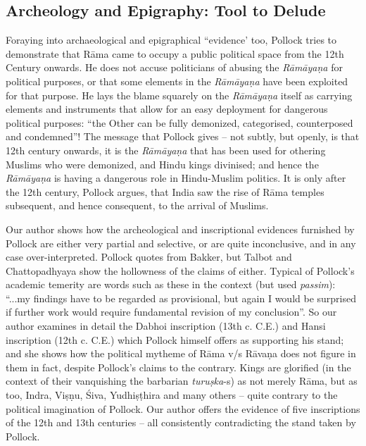 \subsection*{Archeology and Epigraphy: Tool to Delude}

Foraying into archaeological and epigraphical “evidence’ too, Pollock tries to demonstrate that Rāma came to occupy a public political space from the 12th Century onwards. He does not accuse politicians of abusing the {\sl Rāmāyaṇa} for political purposes, or that some elements in the {\sl Rāmāyaṇa} have been exploited for that purpose. He lays the blame squarely on the {\sl Rāmāyaṇa} itself as carrying elements and instruments that allow for an easy deployment for dangerous political purposes: “the Other can be fully demonized, categorised, counterposed and condemned”! The message that Pollock gives -- not subtly, but openly, is that 12th century onwards, it is the {\sl Rāmāyaṇa} that has been used for othering Muslims who were demonized, and Hindu kings divinised; and hence the {\sl Rāmāyaṇa} is having a dangerous role in Hindu-Muslim politics. It is only after the 12th century, Pollock argues, that India saw the rise of Rāma temples subsequent, and hence consequent, to the arrival of Muslims.

Our author shows how the archeological and inscriptional evidences furnished by Pollock are either very partial and selective, or are quite inconclusive, and in any case over-interpreted. Pollock quotes from Bakker, but Talbot and Chattopadhyaya show the hollowness of the claims of either. Typical of Pollock’s academic temerity are words such as these in the context (but used {\sl passim}): “...my findings have to be regarded as provisional, but again I would be surprised if further work would require fundamental revision of my conclusion”. So our author examines in detail the Dabhoi inscription (13th c. C.E.) and Hansi inscription (12th c. C.E.) which Pollock himself offers as supporting his stand; and she shows how the political mytheme of Rāma v/s Rāvaṇa does not figure in them in fact, despite Pollock's claims to the contrary. Kings are glorified (in the context of their vanquishing the barbarian {\sl turuṣka}-s) as not merely Rāma, but as too, Indra, Viṣṇu, Śiva, Yudhiṣṭhira and many others -- quite contrary to the political imagination of Pollock. Our author offers the evidence of five inscriptions of the 12th and 13th centuries -- all consistently contradicting the stand taken by Pollock.\\[-20pt]

